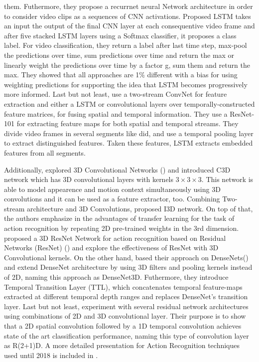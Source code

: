 them. Futhermore, they propose a recurrnet neural Network architecture in order to consider video clips as a sequences of CNN activations.
Proposed LSTM takes an input the output of the final CNN layer at each consequentive video frame and after five stacked LSTM layers using a
Softmax classifier, it proposes a class label. For video classification, they return a label after last time step, max-pool the predictions
over time, sum predictions over time and return the max or linearly weight the predictions over time by a factor g, sum them and return the max.
They showed that all approaches are 1\% different with a bias for using weighting predictions for supporting the idea that LSTM becomes progressively more informed. Last but not least,  \cite{DBLP:journals/corr/MaCKA17} use a two-stream ConvNet for feature extraction and either a LSTM or convolutional layers over temporally-constructed feature matrices, for fusing spatial and temporal information. They use a ResNet-101 for
extracting feature maps for both spatial and temporal streams. They divide video frames in several segments like \cite{DBLP:journals/corr/WangXW0LTG16} did, and use a temporal pooling layer to extract distinguished features. Taken these features, LSTM extracts embedded features from all segments.
\par
Additionally, \cite{Tran2014LearningSF} explored 3D Convolutional Networks (\cite{pmid:22392705}) and introduced C3D network which  has
3D convolutional layers with kernels $ 3 \times 3 \times 3$.
This network is able to  model appearence and motion context simultaneously using 3D convolutions and it can be used as a feature extractor, too.
Combining Two-stream architecture and 3D Convolutions, \cite{DBLP:journals/corr/CarreiraZ17} proposed
I3D network. On top of that, the authors emphasize in the advantages of transfer learning for the task of action recognition by repeating 2D pre-trained weights
in the 3rd dimension. \cite{DBLP:journals/corr/abs-1708-07632} proposed a 3D ResNet Network for action recognition based on Residual Networks (ResNet)
(\cite{DBLP:journals/corr/HeZRS15}) and explore the effectiveness of ResNet with 3D Convolutional kernels.
On the other hand,\cite{DBLP:journals/corr/abs-1711-08200}  based their approach on DenseNets(\cite{DBLP:journals/corr/HuangLW16a}) and extend
DenseNet architecture by using 3D filters and pooling kernels instead of 2D, naming this approach as DenseNet3D. Futhermore, they introduce
Temporal Transition Layer (TTL), which concatenates temporal feature-maps extracted at different temporal depth ranges and replaces DenseNet's
transition layer. Last but not least, \cite{DBLP:journals/corr/abs-1711-11248} experiment with several residual network architectures using combinations of 2D and 3D convolutional layer. Their purpose is
to show that a 2D spatial convolution followed by a 1D temporal convolution achieves state of the art classification performance, naming
this type of convolution layer as R(2+1)D. A more detailed presentation for Action Recognition techniques used until 2018 is included in
\cite{DBLP:journals/corr/abs-1806-11230}.

